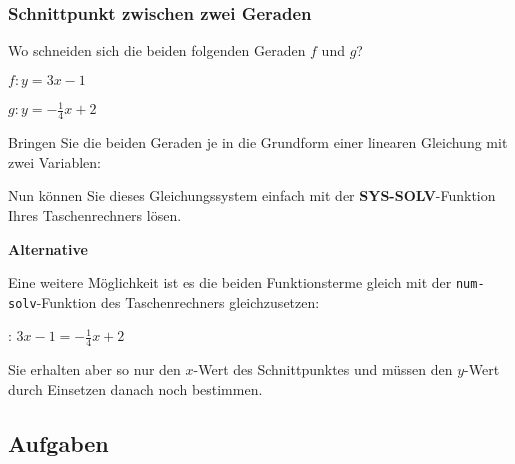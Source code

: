 \subsubsection{Schnittpunkt zwischen zwei Geraden}

Wo schneiden sich die beiden folgenden Geraden $f$ und $g$?

$f: y=3x - 1$

$g: y=-\frac14x +2$

Bringen Sie die beiden Geraden je in die Grundform einer linearen
Gleichung mit zwei Variablen:


Nun können Sie dieses Gleichungssystem einfach mit
der \textbf{SYS-SOLV}-Funktion Ihres Taschenrechners lösen.

\vspace{5mm}


\vspace{5mm}

\textbf{Alternative}

Eine weitere Möglichkeit ist es die beiden Funktionsterme gleich mit
der \texttt{num-solv}-Funktion des Taschenrechners gleichzusetzen:

: $3x-1 = -\frac14x+2$

Sie erhalten aber so nur den $x$-Wert des Schnittpunktes und müssen
den $y$-Wert durch Einsetzen danach noch bestimmen.

\newpage

\subsection*{Aufgaben}

\newpage
